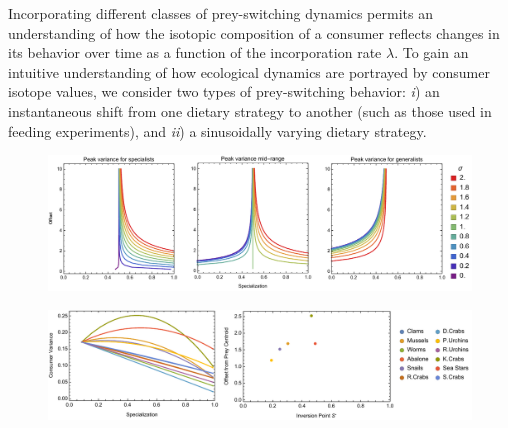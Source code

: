 \documentclass[11pt]{article}
\begin{document}
Incorporating different classes of prey-switching dynamics permits an understanding of how the isotopic composition of a consumer reflects changes in its behavior over time as a function of the incorporation rate $\lambda$.
To gain an intuitive understanding of how ecological dynamics are portrayed by consumer isotope values, we consider two types of prey-switching behavior: {\it i}) an instantaneous shift from one dietary strategy to another (such as those used in feeding experiments), and {\it ii}) a sinusoidally varying dietary strategy.





\begin{figure}[h!]
\centering
\includegraphics[width=1\textwidth]{fig_specvar.pdf}
\caption{
}
\end{figure}



\begin{figure}[h!]
\centering
\includegraphics[width=1\textwidth]{fig_ottervar.pdf}
\caption{
}
\end{figure}
\end{document}
